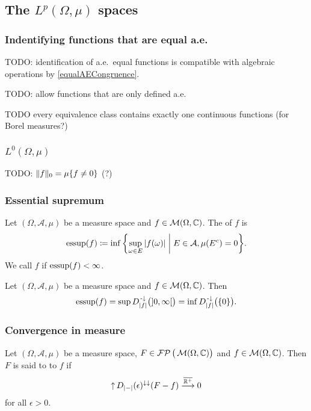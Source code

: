 \subsection{The $L^p(\Omega,\mu)$ spaces}
\subsubsection{Indentifying functions that are equal a.e.}

TODO: identification of a.e.\ equal functions is compatible with algebraic operations by \ref{equalAECongruence}.

TODO: allow functions that are only defined a.e.


\begin{proposition}
TODO every equivalence class contains exactly one continuous functions (for Borel measures?)
\end{proposition}


\subsubsection{$L^0(\Omega, \mu)$}
TODO: $\lVert f\rVert_0 = \mu\{f\neq 0\}$ (?)

\subsubsection{Essential supremum}
\begin{definition}
Let $(\Omega, \mathcal{A}, \mu)$ be a measure space and $f\in \operatorname{\mathcal{M}}(\Omega, \mathbb{C})$. The  of $f$ is
\[ \essup(f) \defeq \inf\setbuilder{\sup_{\omega\in E}|f(\omega)|}{E\in \mathcal{A}, \mu(E^c) = 0}. \]
We call $f$  if $\operatorname{essup}(f)<\infty$.
\end{definition}

\begin{lemma}
Let $(\Omega, \mathcal{A}, \mu)$ be a measure space and $f\in \operatorname{\mathcal{M}}(\Omega, \mathbb{C})$. Then
\[ \essup(f) = \sup D_{|f|}^{\preimf}\big(\interval[o]{0,\infty}\big) = \inf D_{|f|}^{\preimf}\big(\{0\}\big). \]
\end{lemma}

\subsubsection{Convergence in measure}
\begin{definition}
Let $(\Omega, \mathcal{A}, \mu)$ be a measure space, $F\in \operatorname{\mathcal{FP}}\big(\operatorname{\mathcal{M}}(\Omega, \mathbb{C})\big)$ and $f\in \operatorname{\mathcal{M}}(\Omega, \mathbb{C})$. Then $F$ is said to  to $f$ if
\[ \operatorname{\uparrow} D_{|-|}(\epsilon)^{\downarrow\downarrow}(F-f) \overset{\overline{\mathbb{R}^+}}{\longrightarrow} 0 \]
for all $\epsilon > 0$.
\end{definition}

